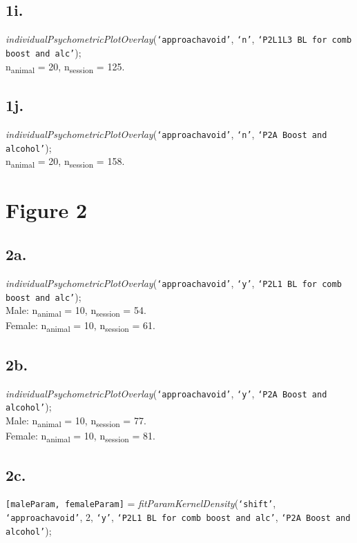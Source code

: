 \documentclass{article}
\begin{document}
\subsection{1i.}
\emph{individualPsychometricPlotOverlay}(\texttt{`approachavoid'}, \texttt{`n'}, \texttt{`P2L1L3 BL for comb boost and alc'});\\
n\textsubscript{animal} = 20, n\textsubscript{session} = 125.

\subsection{1j.}
\emph{individualPsychometricPlotOverlay}(\texttt{`approachavoid'}, \texttt{`n'}, \texttt{`P2A Boost and alcohol'});\\
n\textsubscript{animal} = 20, n\textsubscript{session} = 158.


\section{Figure 2}
\subsection{2a.}
\emph{individualPsychometricPlotOverlay}(\texttt{`approachavoid'}, \texttt{`y'}, \texttt{`P2L1 BL for comb boost and alc'});\\
Male: n\textsubscript{animal} = 10, n\textsubscript{session} = 54.\\
Female: n\textsubscript{animal} = 10, n\textsubscript{session} = 61.\\

\subsection{2b.}
\emph{individualPsychometricPlotOverlay}(\texttt{`approachavoid'}, \texttt{`y'}, \texttt{`P2A Boost and alcohol'});\\
Male: n\textsubscript{animal} = 10, n\textsubscript{session} = 77.\\
Female: n\textsubscript{animal} = 10, n\textsubscript{session} = 81.\\

\subsection{2c.}
\texttt{[maleParam, femaleParam]} = \emph{fitParamKernelDensity}(\texttt{`shift'}, \texttt{`approachavoid'}, 2, \texttt{`y'}, \texttt{`P2L1 BL for comb boost and alc'}, \texttt{`P2A Boost and alcohol'});\\
\end{document}
